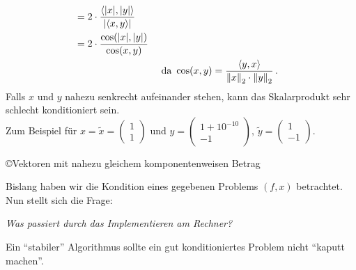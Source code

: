 \begin{Bspe}
\begin{enumerate}[a)]
\begin{align*}
                                                         &= 2\cdot \frac{\langle |x|,|y|\rangle}{|\langle x,y\rangle|} \\
                                                         &= 2 \cdot \frac{\cos(|x|, |y|)}{\cos(x,y)}  \\
                                                         &&&				\text{	da  }\cos(x,y) = \frac{\langle y,x \rangle}{\left\| x \right\|_2 \cdot \left\| y \right\|_2} \, . 
    \end{align*}
    Falls $x$ und $y$ nahezu senkrecht aufeinander stehen, kann das Skalarprodukt sehr schlecht konditioniert sein. \\
    Zum Beispiel für $x=\widetilde{x} = \begin{pmatrix} 1 \\1 \end{pmatrix}$
    und $y=\begin{pmatrix} 1+10^{-10} \\-1 \end{pmatrix},
    \, \widetilde{y}=\begin{pmatrix} 1 \\-1 \end{pmatrix}$. \\
    \begin{image}{\copyright Vektoren mit nahezu gleichem komponentenweisen Betrag}
    \end{image}
  \end{enumerate}	
\end{Bspe}

Bislang haben wir die Kondition eines gegebenen Problems $(f,x)$ betrachtet.
Nun stellt sich die Frage:

\textit{Was passiert durch das Implementieren am Rechner? }

Ein \enquote{stabiler} Algorithmus sollte ein gut konditioniertes
Problem nicht \enquote{kaputt machen}.

